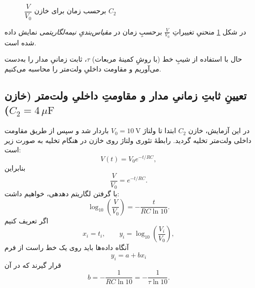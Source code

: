 \documentclass[a4paper, 11pt]{article}
\begin{document}
\begin{figure}
\caption{{$\dfrac{V}{V_0}$ برحسب زمان برای خازن $C_2$}}
\label{fig2}
\centering
{}
\end{figure}


در شکل \ref{fig2} منحنیِ تغییراتِ $\frac{V}{V_0}$ برحسبِ زمان در \emph{مقیاس‌بندیِ نیمه‌لگاریتمی} نمایش داده شده است.


حال با استفاده از شیبِ خط (با روشِ کمینهٔ مربعات) $\tau$، ثابت زمانیِ مدار را به‌دست می‌آوریم و مقاومت داخلیِ ولت‌متر را محاسبه می‌کنیم.


\subsection*{تعیینِ ثابتِ زمانیِ مدار و مقاومتِ داخلیِ ولت‌متر (خازن \texorpdfstring{$C_2 = 4\,\mu\mathrm{F}$}{C2})}

در این آزمایش، خازن $C_2$ ابتدا تا ولتاژ $V_0 = 10~\mathrm{V}$ باردار شد و سپس از طریق مقاومت داخلی ولت‌متر تخلیه گردید. رابطهٔ تئوری ولتاژ روی خازن در هنگام تخلیه به صورت زیر است:
\begin{equation}
V(t) = V_0 e^{-t/RC},
\end{equation}
بنابراین
\begin{equation}
\frac{V}{V_0} = e^{-t/RC}.
\end{equation}
با گرفتن لگاریتم دهدهی، خواهیم داشت:
\begin{equation}
\log_{10}\!\left(\frac{V}{V_0}\right)
  = -\frac{t}{RC\ln 10}.
\end{equation}
اگر تعریف کنیم
\[
x_i = t_i, \qquad
y_i = \log_{10}\!\left(\frac{V_i}{V_0}\right),
\]
آنگاه داده‌ها باید روی یک خط راست از فرم
\begin{equation}
y_i = a + b x_i
\end{equation}
قرار گیرند که در آن
\begin{equation}
b = -\frac{1}{RC\ln 10} = -\frac{1}{\tau \ln 10}.
\end{equation}
\end{document}
